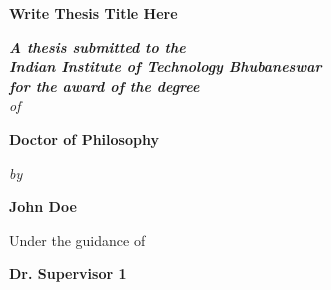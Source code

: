 \begin{titlepage}
\begin{center}

{\LARGE \bfseries Write Thesis Title Here}\\
\vspace*{1cm}

{\large \bfseries \itshape A thesis submitted to the\\
Indian Institute of Technology Bhubaneswar\\
for the award of the degree}\\
\vspace*{0.5cm}
{\large \itshape {of}}\\
\vspace*{0.5cm}

{\selectfont
\huge \bfseries Doctor of Philosophy}\\
\vspace*{0.5cm}

{\large \itshape {by}}\\
\vspace*{0.5cm}

{\Large \bfseries John Doe \\}
\vspace*{0.5cm}

{\large Under the guidance of\\}
\vspace*{0.2cm}

{\Large \bfseries Dr. Supervisor 1\\}


\vspace*{1.0cm}


\end{center}
\end{titlepage}
